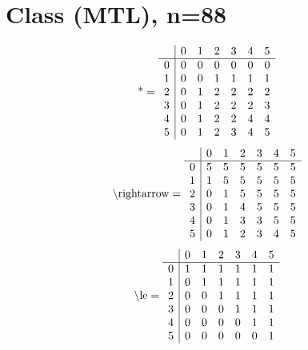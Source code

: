 \documentclass[11pt]{article}
\begin{document}
\section{Class (MTL), n=88}
\[\text{*} = 
\begin{array}{r | r r r r r r}
 & 0 & 1 & 2 & 3 & 4 & 5 \\ \hline
0 & 0 & 0 & 0 & 0 & 0 & 0 \\
1 & 0 & 0 & 1 & 1 & 1 & 1 \\
2 & 0 & 1 & 2 & 2 & 2 & 2 \\
3 & 0 & 1 & 2 & 2 & 2 & 3 \\
4 & 0 & 1 & 2 & 2 & 4 & 4 \\
5 & 0 & 1 & 2 & 3 & 4 & 5 \\
\end{array}
\]
\[\text{\textbackslash rightarrow} = 
\begin{array}{r | r r r r r r}
 & 0 & 1 & 2 & 3 & 4 & 5 \\ \hline
0 & 5 & 5 & 5 & 5 & 5 & 5 \\
1 & 1 & 5 & 5 & 5 & 5 & 5 \\
2 & 0 & 1 & 5 & 5 & 5 & 5 \\
3 & 0 & 1 & 4 & 5 & 5 & 5 \\
4 & 0 & 1 & 3 & 3 & 5 & 5 \\
5 & 0 & 1 & 2 & 3 & 4 & 5 \\
\end{array}
\]
\[\text{\textbackslash le} = 
\begin{array}{r | r r r r r r}
 & 0 & 1 & 2 & 3 & 4 & 5 \\ \hline
0 & 1 & 1 & 1 & 1 & 1 & 1 \\
1 & 0 & 1 & 1 & 1 & 1 & 1 \\
2 & 0 & 0 & 1 & 1 & 1 & 1 \\
3 & 0 & 0 & 0 & 1 & 1 & 1 \\
4 & 0 & 0 & 0 & 0 & 1 & 1 \\
5 & 0 & 0 & 0 & 0 & 0 & 1 \\
\end{array}
\]
\end{document}
